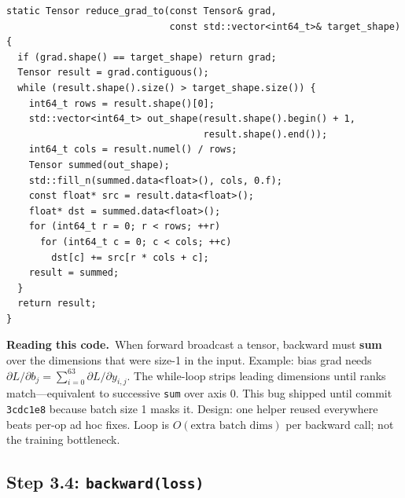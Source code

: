 \documentclass[11pt,a4paper]{article}
\newcommand{\explain}{\par\smallskip\noindent}
\newcommand{\exhead}{\textbf{Reading this code.}\ }
\begin{document}
\begin{lstlisting}[style=cpp]
static Tensor reduce_grad_to(const Tensor& grad,
                             const std::vector<int64_t>& target_shape) {
  if (grad.shape() == target_shape) return grad;
  Tensor result = grad.contiguous();
  while (result.shape().size() > target_shape.size()) {
    int64_t rows = result.shape()[0];
    std::vector<int64_t> out_shape(result.shape().begin() + 1,
                                   result.shape().end());
    int64_t cols = result.numel() / rows;
    Tensor summed(out_shape);
    std::fill_n(summed.data<float>(), cols, 0.f);
    const float* src = result.data<float>();
    float* dst = summed.data<float>();
    for (int64_t r = 0; r < rows; ++r)
      for (int64_t c = 0; c < cols; ++c)
        dst[c] += src[r * cols + c];
    result = summed;
  }
  return result;
}
\end{lstlisting}
\explain\exhead When forward broadcast a tensor, backward must \textbf{sum} over the dimensions
that were size-1 in the input. Example: bias grad needs
$\partial L/\partial b_j = \sum_{i=0}^{63} \partial L/\partial y_{i,j}$. The while-loop
strips leading dimensions until ranks match---equivalent to successive \texttt{sum} over axis 0.
This bug shipped until commit \texttt{3cdc1e8} because batch size 1 masks it. Design: one
helper reused everywhere beats per-op ad hoc fixes. Loop is $O(\text{extra batch dims})$ per
backward call; not the training bottleneck.

\subsection{Step 3.4: \texttt{backward(loss)}}
\end{document}

